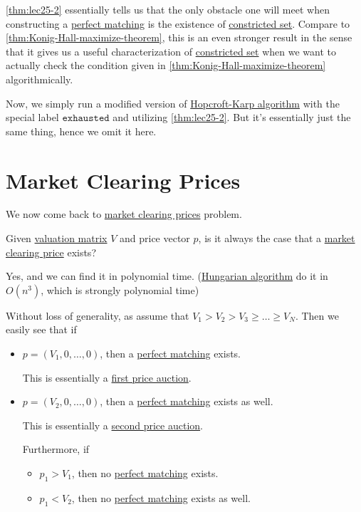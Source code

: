 \begin{remark}
	\autoref{thm:lec25-2} essentially tells us that the only obstacle one will meet when constructing a \hyperref[def:perfect-matching]{perfect matching} is the existence of \hyperref[def:constricted-set]{constricted set}. Compare to \autoref{thm:Konig-Hall-maximize-theorem}, this is an even stronger result in the sense that it gives us a useful characterization of \hyperref[def:constricted-set]{constricted set} when we want to actually check the condition given in \autoref{thm:Konig-Hall-maximize-theorem} algorithmically.
\end{remark}

Now, we simply run a modified version of \hyperref[algo:Hopcroft-Karp-algorithm]{Hopcroft-Karp algorithm} with the special label \(\mathtt{exhausted}\) and utilizing \autoref{thm:lec25-2}. But it's essentially just the same thing, hence we omit it here.

\section{Market Clearing Prices}
We now come back to \hyperref[note:market-clearing-prices]{market clearing prices} problem.

\begin{problem}
Given \hyperref[def:valuation-matrix]{valuation matrix} \(V\) and price vector \(p\), is it always the case that a \hyperref[note:market-clearing-prices]{market clearing price} exists?
\end{problem}
\begin{answer}
	Yes, and we can find it in polynomial time. (\href{https://en.wikipedia.org/wiki/Hungarian_algorithm}{Hungarian algorithm} do it in \(O(n^{3})\), which is strongly polynomial time)
\end{answer}

Without loss of generality, as assume that \(V_{1}>V_{2}>V_{3}\geq \ldots \geq V_{N}\). Then we easily see that if
\begin{itemize}
	\item \(p = (V_{1}, 0, \ldots , 0 )\), then a \hyperref[def:perfect-matching]{perfect matching} exists.
	      \begin{note}
		      This is essentially a \hyperref[eg:first-price-auction]{first price auction}.
	      \end{note}
	\item \(p = (V_{2}, 0, \ldots , 0 )\), then a \hyperref[def:perfect-matching]{perfect matching} exists as well.
	      \begin{note}
		      This is essentially a \hyperref[eg:second-price-auction]{second price auction}.
	      \end{note}
	      Furthermore, if
	      \begin{itemize}
		      \item \(p_{1}>V_{1}\), then no \hyperref[def:perfect-matching]{perfect matching} exists.
		      \item \(p_{1}<V_{2}\), then no \hyperref[def:perfect-matching]{perfect matching} exists as well.
	      \end{itemize}
\end{itemize}

